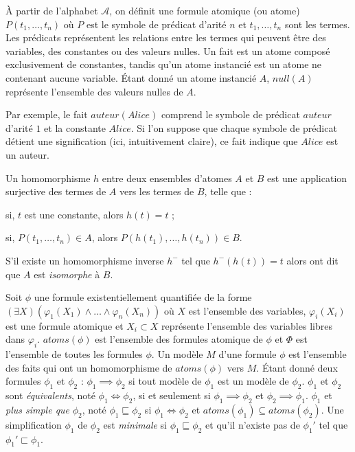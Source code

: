 \begin{definition}[Atome]
À partir de l'alphabet $\mathcal{A}$, on définit une formule atomique (ou atome) $P(t_1, \dots, t_n)$ où $P$ est le symbole de prédicat d'arité $n$ et $t_1, \dots, t_n$ sont les termes.
Les prédicats représentent les relations entre les termes qui peuvent être des variables, des constantes ou des valeurs nulles.
Un fait est un atome composé exclusivement de constantes, tandis qu'un atome instancié est un atome ne contenant aucune variable.
Étant donné un atome instancié $A$, $null(A)$ représente l'ensemble des valeurs nulles de $A$.
\end{definition}

Par exemple, le fait $auteur(Alice)$ comprend le symbole de prédicat $auteur$ d'arité $1$ et la constante $Alice$.
Si l'on suppose que chaque symbole de prédicat détient une signification (ici, intuitivement claire), ce fait indique que $Alice$ est un auteur.

\begin{definition}[Homomorphisme]
Un homomorphisme $h$ entre deux ensembles d'atomes $A$ et $B$ est une application surjective des termes de $A$ vers les termes de $B$, telle que :
\begin{enumerate*}[label=(\roman*)]
    \item si, $t$ est une constante, alors $h(t) = t$ ;
    \item si, $P(t_1, \dots, t_n) \in A$, alors $P(h(t_1), \dots, h(t_n)) \in B$.
\end{enumerate*}
S'il existe un homomorphisme inverse $h^-$ tel que $h^-(h(t)) = t$ alors ont dit que $A$ est \emph{isomorphe} à $B$.
\end{definition}

\begin{definition}[Simplication]
Soit $\phi$ une formule existentiellement quantifiée de la forme $(\exists X)(\varphi_1(X_1) \land \dots \land \varphi_n(X_n))$ où $X$ est l'ensemble des variables, $\varphi_i(X_i)$ est une formule atomique et $X_i \subset X$ représente l'ensemble des variables libres dans $\varphi_i$.
$atoms(\phi)$ est l'ensemble des formules atomique de $\phi$ et $\Phi$ est l'ensemble de toutes les formules $\phi$.
Un modèle $M$ d'une formule $\phi$ est l'ensemble des faits qui ont un homomorphisme de $atoms(\phi)$ vers $M$.
Étant donné deux formules $\phi_1$ et $\phi_2$ : $\phi_1 \implies \phi_2$ si tout modèle de $\phi_1$ est un modèle de $\phi_2$.
$\phi_1$ et $\phi_2$ sont \emph{équivalents}, noté $\phi_1 \iff \phi_2$, si et seulement si $\phi_1 \implies \phi_2$ et $\phi_2 \implies \phi_1$.
$\phi_1$ et \emph{plus simple que} $\phi_2$, noté $\phi_1 \sqsubseteq \phi_2$ si $\phi_1 \iff \phi_2$ et $atoms(\phi_1) \subseteq atoms(\phi_2)$.
Une simplification $\phi_1$ de $\phi_2$ est \emph{minimale} si $\phi_1 \sqsubseteq \phi_2$ et qu'il n'existe pas de $\phi_1'$ tel que $\phi_1' \sqsubset \phi_1$.
\end{definition}

